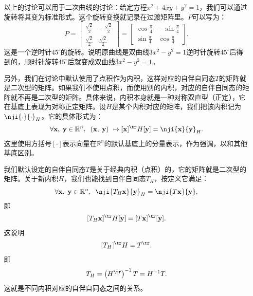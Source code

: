\documentclass[12pt,UTF8]{ctexbook}
\begin{document}
以上的讨论可以用于二次曲线的讨论：给定方程$x^2 + 4xy + y^2 = 1$，我们可以通过旋转将其变为标准形式。这个旋转变换就记录在过渡矩阵里。$P$可以写为：
$$
P = 
\begin{bmatrix}
    \displaystyle\frac{\sqrt{2}}{2} & \displaystyle -\frac{\sqrt{2}}{2} \\\displaystyle \frac{\sqrt{2}}{2} & \displaystyle\frac{\sqrt{2}}{2}
\end{bmatrix} = \begin{bmatrix}
    \displaystyle\cos{\frac{\pi}{4}} & \displaystyle -\sin{\frac{\pi}{4}} \\ \displaystyle\sin{\frac{\pi}{4}} & \displaystyle\cos{\frac{\pi}{4}}
\end{bmatrix}.
$$
这是一个逆时针$45^\circ$的旋转。说明原曲线是双曲线$3x^2 - y^2 = 1$逆时针旋转$45^\circ$后得到的，顺时针旋转$45^\circ$后就变成双曲线$3x^2 - y^2 = 1$。

另外，我们在讨论中默认使用了点积作为内积，这样对应的自伴自同态$T$的矩阵就是二次型的矩阵。如果我们不使用点积，而使用别的内积，对应的自伴自同态的矩阵就不再是二次型的矩阵。具体来说，内积本身就是一种对称双直型（正定），它在基底上表现为对称正定矩阵。设$H$是某个内积对应的矩阵，我们把该内积记为$\nji{\cdot}{\cdot}_H$。它的具体形式为：
$$ \forall \mathbf{x}, \; \mathbf{y} \in \mathbb{R}^n , \;\; (\mathbf{x}, \; \mathbf{y}) \; \mapsto [\mathbf{x}]^{\tr} H[\mathbf{y}] = \nji{\mathbf{x}}{\mathbf{y}}_H. $$
这里使用方括号$[\cdot]$表示向量在$\mathbb{R}^n$的默认基底上的分量表示，作为强调，以和其他基底区别。

我们默认设定的自伴自同态$T$是关于经典内积（点积）的，它的矩阵就是二次型的矩阵。关于新内积$H$，我们也能找到自伴自同态$T_H$，按定义它满足：
$$ \forall \mathbf{x}, \; \mathbf{y} \in \mathbb{R}^n , \;\; \nji{T_H\mathbf{x}}{\mathbf{y}}_H = \nji{T\mathbf{x}}{\mathbf{y}}, $$
即
$$ [T_H\mathbf{x}]^{\tr} H[\mathbf{y}] = [T\mathbf{x}]^{\tr} [\mathbf{y}]. $$
这说明
$$ [T_H]^{\tr} H = T^{\tr}.$$
即
$$ T_H = \left(H^{\tr}\right)^{-1} T = H^{-1} T.$$
这就是不同内积对应的自伴自同态之间的关系。
\end{document}
